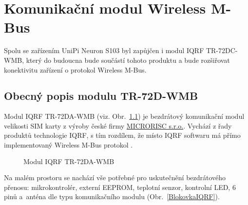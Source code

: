 \chapter{Komunikační modul Wireless M-Bus}
\label{ChapterKomunikacniModul}

Spolu se zařízením UniPi Neuron S103 byl zapůjčen i modul IQRF TR-72DC-WMB, který do budoucna bude součástí tohoto produktu a bude rozšiřovat konektivitu zařízení o protokol Wireless M-Bus. 

\section{Obecný popis modulu TR-72D-WMB}

Modul IQRF TR-72DA-WMB (viz. Obr.~\ref{ObrazekModulu}) je bezdrátový komunikační modul velikosti SIM karty z výroby české firmy \href{http://microrisc.com/cs/}{MICRORISC s.r.o.}. Vychází z řady produktů technologie IQRF, s tím rozdílem, že místo IQRF softwaru má přímo implementovaný Wireless M-Bus protokol \cite{ModulIQRF}. 



\begin{figure}[!ht]
		\vspace{10pt}
    \centering
			\hspace*{15mm}
		\caption{Modul IQRF TR-72DA-WMB \cite{ModulIQRF}}
		\label{ObrazekModulu}
\end{figure}

Na malém prostoru se nachází vše potřebné pro uskutečnění bezdrátového přenosu: mikrokontrolér, externí EEPROM, teplotní senzor, kontrolní LED, 6 pinů a~anténa dle typu komunikačního modulu (Obr.~\ref{BlokovkaIQRF}).



